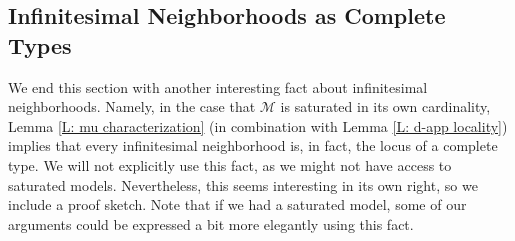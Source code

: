 \documentclass{amsart}
\theoremstyle{definition}
\begin{document}
\subsection{Infinitesimal Neighborhoods as Complete Types}

    We end this section with another interesting fact about infinitesimal neighborhoods. Namely, in the case that $\mathcal M$ is saturated in its own cardinality, Lemma \ref{L: mu characterization} (in combination with Lemma \ref{L: d-app locality}) implies that every infinitesimal neighborhood is, in fact, the locus of a complete type. We will not explicitly use this fact, as we might not have access to saturated models. Nevertheless, this seems interesting in its own right, so we include a proof sketch. Note that if we had a saturated model, some of our arguments could be expressed a bit more elegantly using this fact.
    
\end{document}
